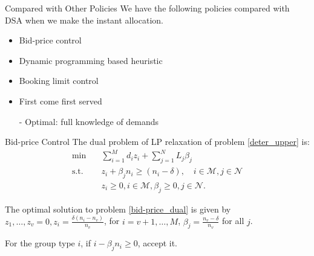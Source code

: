     \begin{frame}{Compared with Other Policies}
      We have the following policies compared with DSA when we make the instant allocation.
    
      \begin{itemize}
        \item Bid-price control
        \item Dynamic programming based heuristic
        \item Booking limit control
        \item First come first served
        \item[-] Optimal: full knowledge of demands
      \end{itemize}
    \end{frame}

      \begin{frame}{Bid-price Control}
        The dual problem of LP relaxation of problem \eqref{deter_upper} is:
        \begin{equation}\label{bid-price_dual}
          \begin{aligned}
          \min \quad & \sum_{i=1}^{M} d_i z_i + \sum_{j= 1}^{N} L_j \beta_{j} \\
          \text {s.t.} \quad & z_{i} + \beta_j n_i \geq (n_i-\delta), \quad i \in \mathcal{M}, j \in \mathcal{N} \\
          & z_{i} \geq 0, i \in \mathcal{M}, \beta_{j} \geq 0, j \in \mathcal{N}.
          \end{aligned}
        \end{equation}
        
        \small
        
        The optimal solution to problem \eqref{bid-price_dual} is given by $z_1, \ldots, z_v =0, z_i = \frac{\delta (n_i - n_v)}{n_v}$, for $i = v + 1, \ldots, M$, $\beta_j = \frac{n_v - \delta}{n_v}$ for all $j$.
        \vspace{0.5cm}

        For the group type $i$, if $i - \beta_j n_i \geq 0$, accept it. 
      \end{frame}

